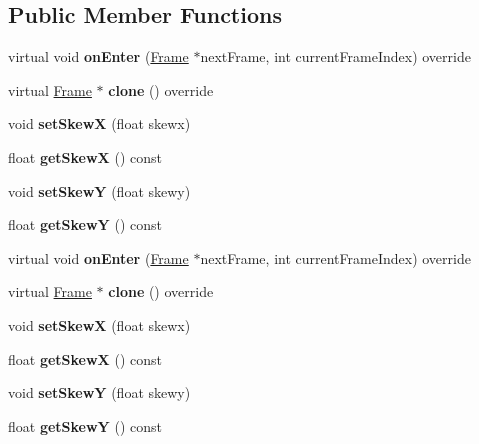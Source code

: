 \subsection*{Public Member Functions}
\begin{DoxyCompactItemize}
\item 
\mbox{\label{classSkewFrame_ad20d40392d8d61a93131e4b010538657}} 
virtual void {\bfseries on\+Enter} (\hyperlink{classFrame}{Frame} $\ast$next\+Frame, int current\+Frame\+Index) override
\item 
\mbox{\label{classSkewFrame_a44ab6a52eeffd28f75844efc31305add}} 
virtual \hyperlink{classFrame}{Frame} $\ast$ {\bfseries clone} () override
\item 
\mbox{\label{classSkewFrame_a47bb4c6dca97ef2eca914113e8435048}} 
void {\bfseries set\+SkewX} (float skewx)
\item 
\mbox{\label{classSkewFrame_ad633a49d0cc8eeba1647ebc484ebbeaf}} 
float {\bfseries get\+SkewX} () const
\item 
\mbox{\label{classSkewFrame_a8417c85bfd092d9114e127c92b6ea6b7}} 
void {\bfseries set\+SkewY} (float skewy)
\item 
\mbox{\label{classSkewFrame_a274d4839eaa93feca52a64da802b9469}} 
float {\bfseries get\+SkewY} () const
\item 
\mbox{\label{classSkewFrame_aea063caac9ce37828a230a006af8b955}} 
virtual void {\bfseries on\+Enter} (\hyperlink{classFrame}{Frame} $\ast$next\+Frame, int current\+Frame\+Index) override
\item 
\mbox{\label{classSkewFrame_a14ce567fff00a515deb984a665f97f61}} 
virtual \hyperlink{classFrame}{Frame} $\ast$ {\bfseries clone} () override
\item 
\mbox{\label{classSkewFrame_a47bb4c6dca97ef2eca914113e8435048}} 
void {\bfseries set\+SkewX} (float skewx)
\item 
\mbox{\label{classSkewFrame_ad633a49d0cc8eeba1647ebc484ebbeaf}} 
float {\bfseries get\+SkewX} () const
\item 
\mbox{\label{classSkewFrame_a8417c85bfd092d9114e127c92b6ea6b7}} 
void {\bfseries set\+SkewY} (float skewy)
\item 
\mbox{\label{classSkewFrame_a274d4839eaa93feca52a64da802b9469}} 
float {\bfseries get\+SkewY} () const
\end{DoxyCompactItemize}
